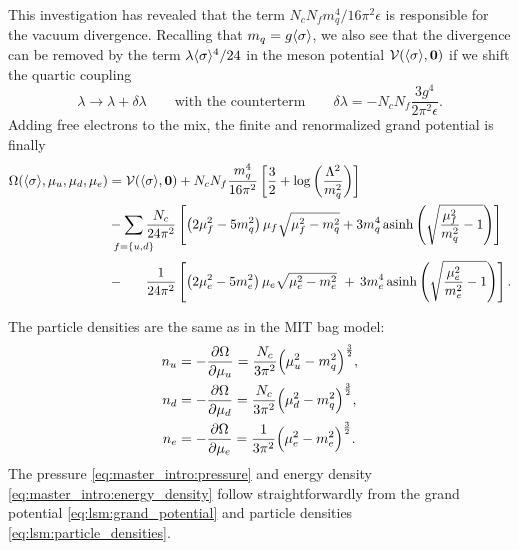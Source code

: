 This investigation has revealed that the term $N_c N_f m_q^4 / 16 \pi^2 \epsilon$ is responsible for the vacuum divergence.
Recalling that $m_q=g \langle \sigma \rangle$,
we also see that the divergence can be removed by the term $\lambda \langle \sigma \rangle^4 / 24$ in the meson potential $\mathcal{V}(\langle \sigma \rangle,{\bm{0}})$
if we shift the quartic coupling
\begin{equation}
	\lambda \rightarrow \lambda + \delta\lambda
	\qquad \text{with the counterterm} \qquad
	\delta\lambda = -N_c N_f \frac{3 g^4}{2 \pi^2 \epsilon} .
\end{equation}
Adding free electrons to the mix, the finite and renormalized grand potential is finally
\begin{equation}
\begin{split}
	\Omega(\avg{\sigma},\mu_u,\mu_d,\mu_e) &= \pot(\avg{\sigma},\vec{0}) + N_c N_f \frac{m_q^4}{16 \pi^2} \left[ \frac{3}{2} + \log\left(\frac{{\Lambda}^2}{m_q^2}\right) \right] \\
	                                       &-\smashoperator{\sum_{\vphantom{\big|} f=\{u,d\}}} \frac{N_c}{24 \pi^2} \left[ \left( 2 \mu_f^2 - 5 m_q^2 \right) \mu_f \sqrt{\mu_f^2 - m_q^2} + 3 m_q^4 \asinh \left( \sqrt{\frac{\mu_{\smash{f}}^2}{m_q^2}-1} \right) \right] \\
	                                       &-\phantom{\sum} \, \frac{1}{24 \pi^2} \left[ \left( 2 \mu_e^2 - 5 m_e^2 \right) \mu_e \sqrt{\mu_e^2 - m_e^2} \, \, + \, 3 m_e^4 \asinh \left( \sqrt{\frac{\mu_{\smash{e}}^2}{m_e^2}-1} \right) \right].
\end{split}
\label{eq:lsm:grand_potential}
\end{equation}

The particle densities are the same as in the MIT bag model:
\begin{subequations}
\begin{align}
	n_u &= -\pdv{\Omega}{\mu_u} = \frac{N_c}{3 \pi^2} \Big( \mu_u^2 - m_q^2 \Big)^{\frac32}, \\
	n_d &= -\pdv{\Omega}{\mu_d} = \frac{N_c}{3 \pi^2} \Big( \mu_d^2 - m_q^2 \Big)^{\frac32}, \\
	n_e &= -\pdv{\Omega}{\mu_e} = \frac{  1}{3 \pi^2} \Big( \mu_e^2 - m_e^2 \Big)^{\frac32}.
\end{align}%
\label{eq:lsm:particle_densities}%
\end{subequations}%
The pressure \eqref{eq:master_intro:pressure} and energy density \eqref{eq:master_intro:energy_density} follow straightforwardly from the grand potential \eqref{eq:lsm:grand_potential} and particle densities \eqref{eq:lsm:particle_densities}.

